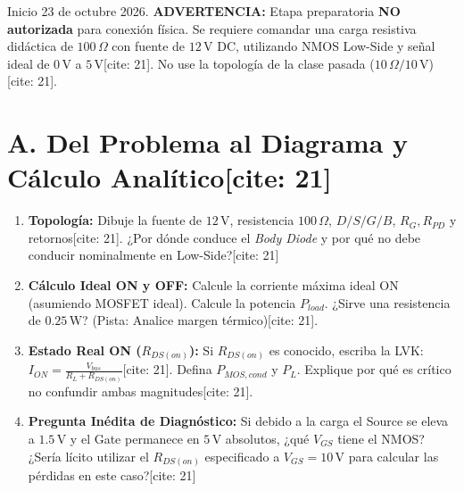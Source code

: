 \documentclass[11pt, a4paper]{article}
\begin{document}
\begin{tcolorbox}[colback=ucbblue!5, colframe=ucbblue, title=\textbf{Hito 3 $\cdot$ E1 — Guía Autónoma de Diseño Low-Side (ESTUDIANTES)[cite: 21]}]
    Inicio 23 de octubre 2026. \textbf{ADVERTENCIA:} Etapa preparatoria \textbf{NO autorizada} para conexión física. 
    Se requiere comandar una carga resistiva didáctica de $100\,\Omega$ con fuente de $12\,\text{V}$ DC, utilizando NMOS Low-Side y señal ideal de $0\,\text{V}$ a $5\,\text{V}$[cite: 21]. No use la topología de la clase pasada ($10\,\Omega/10\,\text{V}$)[cite: 21].
\end{tcolorbox}

\section*{A. Del Problema al Diagrama y Cálculo Analítico[cite: 21]}
\begin{enumerate}
    \item \textbf{Topología:} Dibuje la fuente de $12\,\text{V}$, resistencia $100\,\Omega$, $D/S/G/B$, $R_G, R_{PD}$ y retornos[cite: 21]. ¿Por dónde conduce el \textit{Body Diode} y por qué no debe conducir nominalmente en Low-Side?[cite: 21] \hrulefill
    
    \item \textbf{Cálculo Ideal ON y OFF:} Calcule la corriente máxima ideal ON (asumiendo MOSFET ideal). Calcule la potencia $P_{load}$. ¿Sirve una resistencia de $0.25\,\text{W}$? (Pista: Analice margen térmico)[cite: 21]. \hrulefill \\[0.2cm] \hrulefill
    
    \item \textbf{Estado Real ON ($R_{DS(on)}$):} Si $R_{DS(on)}$ es conocido, escriba la LVK: $I_{ON} = \frac{V_{bus}}{R_L + R_{DS(on)}}$[cite: 21]. Defina $P_{MOS,cond}$ y $P_L$. Explique por qué es crítico no confundir ambas magnitudes[cite: 21]. \hrulefill \\[0.2cm] \hrulefill
    
    \item \textbf{Pregunta Inédita de Diagnóstico:} Si debido a la carga el Source se eleva a $1.5\,\text{V}$ y el Gate permanece en $5\,\text{V}$ absolutos, ¿qué $V_{GS}$ tiene el NMOS? ¿Sería lícito utilizar el $R_{DS(on)}$ especificado a $V_{GS}=10\,\text{V}$ para calcular las pérdidas en este caso?[cite: 21] \hrulefill \\[0.2cm] \hrulefill
\end{enumerate}
\end{document}
